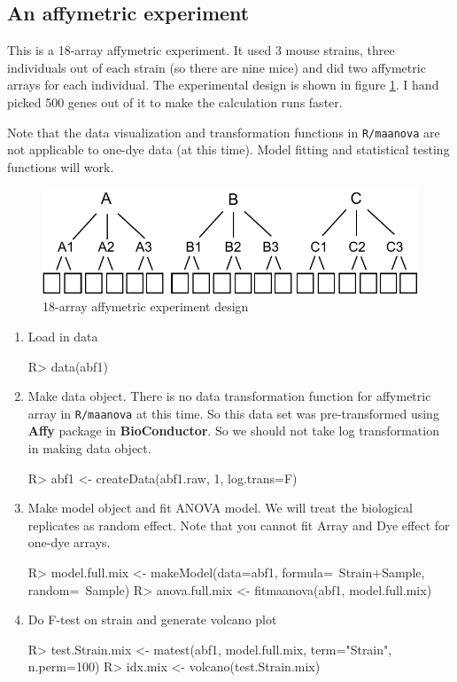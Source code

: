 \subsection{An affymetric experiment}
This is a 18-array affymetric experiment. 
It used 3 mouse strains, three individuals
out of each strain (so there are nine mice) and did two
affymetric arrays for each individual. The experimental
design is shown in figure \ref{fig:abf1}. I hand picked
500 genes out of it to make the calculation runs faster.

Note that the data visualization and transformation
functions in {\tt R/maanova} are not
applicable to one-dye data (at this time). Model fitting
and statistical testing functions will work.

\begin{figure}[htbp]
\centering
\includegraphics{abf1}
\caption{18-array affymetric experiment design}
\label{fig:abf1}
\end{figure}


\begin{enumerate}
\item Load in data \\
\begin{Sinput}
R> data(abf1)
\end{Sinput}

\item Make data object. There is no data transformation function
for affymetric array in {\tt R/maanova} at this time. So this
data set was pre-transformed using {\bf Affy} package in 
{\bf BioConductor}. So we should not take log transformation
in making data object.
\begin{Sinput}
R> abf1 <- createData(abf1.raw, 1, log.trans=F)
\end{Sinput}

\item Make model object and fit ANOVA model. We will treat 
the biological replicates as random effect.
Note that you cannot fit Array and Dye effect
for one-dye arrays.
\begin{Sinput}
R> model.full.mix <- makeModel(data=abf1, formula=~Strain+Sample, 
       random=~Sample)
R> anova.full.mix <- fitmaanova(abf1, model.full.mix)
\end{Sinput}

\item Do F-test on strain and generate volcano plot
\begin{Sinput}
R> test.Strain.mix <- matest(abf1, model.full.mix, term="Strain", 
          n.perm=100)
R> idx.mix <- volcano(test.Strain.mix)
\end{Sinput}

\end{enumerate}

